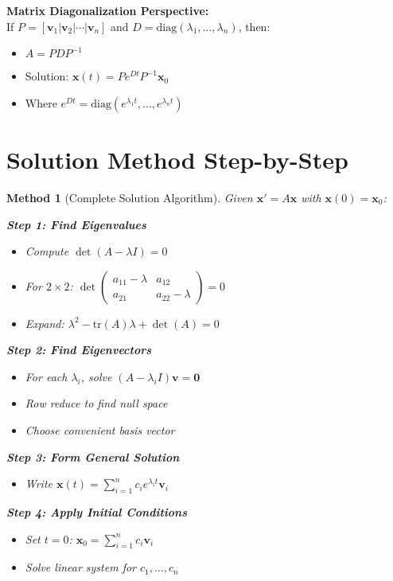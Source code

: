 \documentclass[12pt]{article}
\newtheorem{method}{Method}
\begin{document}
\begin{keypoint}
\textbf{Matrix Diagonalization Perspective:}\\
If $P = [\mathbf{v}_{1} | \mathbf{v}_{2} | \cdots | \mathbf{v}_{n}]$ and $D = \text{diag}(\lambda_{1}, \ldots, \lambda_{n})$, then:
\begin{itemize}
\item $A = PDP^{-1}$
\item Solution: $\mathbf{x}(t) = Pe^{Dt}P^{-1}\mathbf{x}_{0}$
\item Where $e^{Dt} = \text{diag}(e^{\lambda_{1} t}, \ldots, e^{\lambda_{n} t})$
\end{itemize}
\end{keypoint}

\section{Solution Method Step-by-Step}

\begin{method}[Complete Solution Algorithm]
Given $\mathbf{x}' = A\mathbf{x}$ with $\mathbf{x}(0) = \mathbf{x}_{0}$:

\textbf{Step 1: Find Eigenvalues}
\begin{itemize}
\item Compute $\det(A - \lambda I) = 0$
\item For $2 \times 2$: $\det\begin{pmatrix} a_{11}-\lambda & a_{12} \\ a_{21} & a_{22}-\lambda \end{pmatrix} = 0$
\item Expand: $\lambda^{2} - \text{tr}(A)\lambda + \det(A) = 0$
\end{itemize}

\textbf{Step 2: Find Eigenvectors}
\begin{itemize}
\item For each $\lambda_{i}$, solve $(A - \lambda_{i} I)\mathbf{v} = \mathbf{0}$
\item Row reduce to find null space
\item Choose convenient basis vector
\end{itemize}

\textbf{Step 3: Form General Solution}
\begin{itemize}
\item Write $\mathbf{x}(t) = \sum_{i=1}^{n} c_{i} e^{\lambda_{i} t}\mathbf{v}_{i}$
\end{itemize}

\textbf{Step 4: Apply Initial Conditions}
\begin{itemize}
\item Set $t = 0$: $\mathbf{x}_{0} = \sum_{i=1}^{n} c_{i} \mathbf{v}_{i}$
\item Solve linear system for $c_{1}, \ldots, c_{n}$
\end{itemize}
\end{method}
\end{document}
